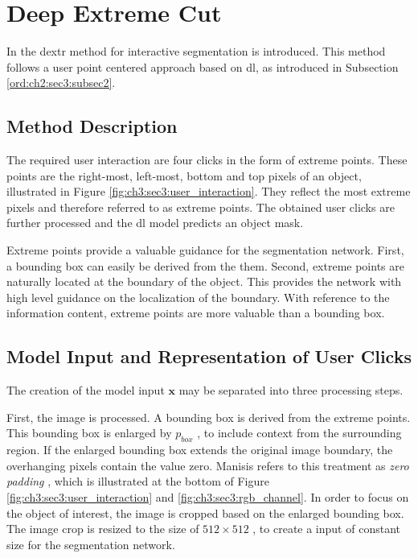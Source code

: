 
\section{Deep Extreme Cut}\label{ord:ch3:sec3}

In \cite{Man18-DEXTR} the \gls{dextr} method for interactive segmentation is introduced.
This method follows a user point centered approach based on \gls{dl}, as introduced in Subsection \ref{ord:ch2:sec3:subsec2}.


\subsection{Method Description}\label{ord:ch3:sec3:subsec1}

The required user interaction are four clicks in the form of extreme points.
These points are the right-most, left-most, bottom and top pixels of an object,  illustrated in Figure \ref{fig:ch3:sec3:user_interaction}.
They reflect the most extreme pixels and therefore referred to as extreme points.
The obtained user clicks are further processed and the \gls{dl} model predicts an object mask.

Extreme points provide a valuable guidance for the segmentation network.
First, a bounding box can easily be derived from the them.
Second, extreme points are naturally located at the boundary of the object.
This provides the network with high level guidance on the localization of the boundary.
With reference to the information content, extreme points are more valuable than a bounding box.

\subsection{Model Input and Representation of User Clicks}\label{ord:ch3:sec3:subsec2}

The creation of the model input $\textbf{x}$ may be separated into three processing steps.

First, the image is processed. 
A bounding box is derived from the extreme points. 
This bounding box is enlarged by $p_{{box}}$ , to include context from the surrounding region.
If the enlarged bounding box extends the original image boundary, the overhanging pixels contain the value zero.
Manisis \etal refers to this treatment as \textit{zero padding} \cite{Man18-DEXTR}, which is illustrated at the bottom of Figure \ref{fig:ch3:sec3:user_interaction} and \ref{fig:ch3:sec3:rgb_channel}.
In order to focus on the object of interest, the image is cropped based on the enlarged bounding box.
The image crop is resized to the size of $512 \times 512$ , to create a input of constant size for the segmentation network.

